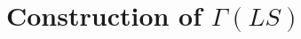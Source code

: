 \documentclass[11pt,letterpaper]{article}
\newcommand{\1}{\mathbb{1}}
\newcommand{\Pg}{\mathcal{P}}
\newcommand{\J}{\mathcal{J}}
\newcommand{\MS}{MS}
\newcommand{\LS}{LS}
\theoremstyle{definition}
\begin{document}
\section{Construction of $\Gamma(\LS)$}
\label{sec:construct}
%
\end{document}
